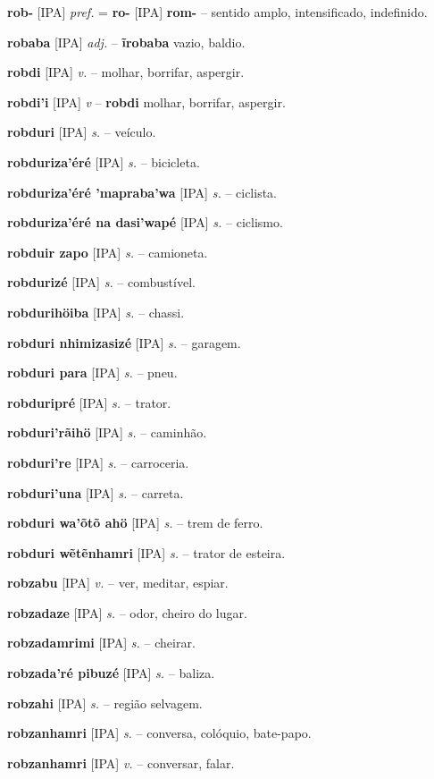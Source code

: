 \textbf{rob-} [IPA] \textit{pref.} = \textbf{ro-} [IPA] \textbf{rom-} -- sentido amplo, intensificado, indefinido.

\textbf{robaba} [IPA] \textit{adj.} -- \textbf{ĩrobaba} vazio, baldio.

\textbf{robdi} [IPA] \textit{v.} -- molhar, borrifar, aspergir.

\textbf{robdi'i} [IPA] \textit{v} -- \textbf{robdi} molhar, borrifar, aspergir.

\textbf{robduri} [IPA] \textit{s.} -- veículo.

\textbf{robduriza'éré} [IPA] \textit{s.} -- bicicleta.

\textbf{robduriza'éré 'mapraba'wa} [IPA] \textit{s.} -- ciclista.

\textbf{robduriza'éré na dasi'wapé} [IPA] \textit{s.} -- ciclismo.

\textbf{robduir zapo} [IPA] \textit{s.} -- camioneta.

\textbf{robdurizé} [IPA] \textit{s.} -- combustível.

\textbf{robdurihöiba} [IPA] \textit{s.} -- chassi.

\textbf{robduri nhimizasizé} [IPA] \textit{s.} -- garagem.

\textbf{robduri para} [IPA] \textit{s.} -- pneu.

\textbf{robduripré} [IPA] \textit{s.} -- trator.

\textbf{robduri'rãihö} [IPA] \textit{s.} -- caminhão.

\textbf{robduri're} [IPA] \textit{s.} -- carroceria.

\textbf{robduri'una} [IPA] \textit{s.} -- carreta.

\textbf{robduri wa'õtõ ahö} [IPA] \textit{s.} -- trem de ferro.

\textbf{robduri wẽtẽnhamri} [IPA] \textit{s.} -- trator de esteira.

\textbf{robzabu} [IPA] \textit{v.} -- ver, meditar, espiar.

\textbf{robzadaze} [IPA] \textit{s.} -- odor, cheiro do lugar.

\textbf{robzadamrimi} [IPA] \textit{s.} -- cheirar.

\textbf{robzada'ré pibuzé} [IPA] \textit{s.} -- baliza.

\textbf{robzahi} [IPA] \textit{s.} -- região selvagem.

\textbf{robzanhamri} [IPA] \textit{s.} -- conversa, colóquio, bate-papo.

\textbf{robzanhamri} [IPA] \textit{v.} -- conversar, falar.

